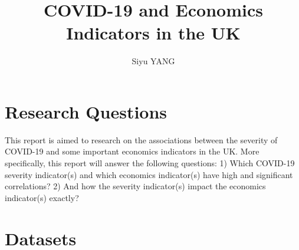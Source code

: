 \documentclass[12pt, a4paper]{report}
\title{COVID-19 and Economics Indicators in the UK}
\author{Siyu YANG}
\date{}
\begin{document}
\maketitle

\section{Research Questions}
This report is aimed to research on the associations between the severity of COVID-19 and some important 
economics indicators in the UK. More specifically, this report will answer the following questions:
1) Which COVID-19 severity indicator(s) and which economics indicator(s) have high and significant correlations?
2) And how the severity indicator(s) impact the economics indicator(s) exactly?


\section{Datasets}
\end{document}
